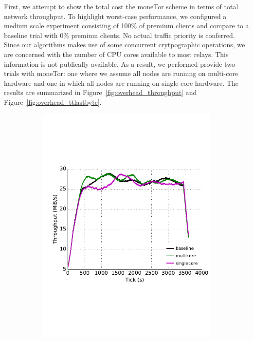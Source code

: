 First, we attempt to show the total cost the moneTor scheme in terms of total
network throughput. To highlight worst-case performance, we configured a medium
scale experiment consisting of 100\% of premium clients and compare to a
baseline trial with 0\% premium clients. No actual traffic priority is
conferred. Since our algorithms makes use of some concurrent crytpographic
operations, we are concerned with the number of CPU cores available to most
relays. This information is not publically available. As a result, we performed
provide two trials with moneTor: one where we assume all nodes are running on
multi-core hardware and one in which all nodes are running on single-core
hardware. The results are summarized in Figure~\ref{fig:overhead_throughput} and
Figure~\ref{fig:overhead_ttlastbyte}.

\begin{figure} \centering
	\begin{subfigure}[t]{0.32\textwidth} \centering
\includegraphics[trim={0 3cm 0 3cm}, clip, width=1.0\textwidth]{images/overhead_throughput.pdf}

\end{subfigure}
\end{figure}
